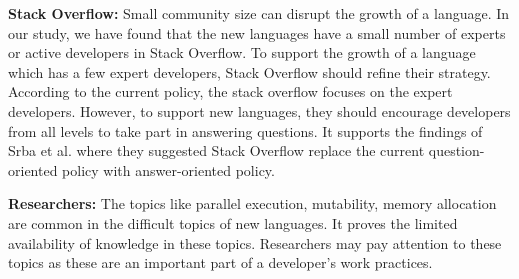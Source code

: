 \indent \textbf{Stack Overflow:} Small community size can disrupt the growth of a language. In our study, we have found that the new languages have a small number of experts or active developers in Stack Overflow. To support the growth of a language which has a few expert developers,  Stack Overflow should refine their strategy. According to the current policy, the stack overflow focuses on the expert developers. However, to support new languages, they should encourage developers from all levels to take part in answering questions. It supports the findings of Srba et al.\citep{Srba2016} where they suggested Stack Overflow replace the current question-oriented policy with answer-oriented policy.

\indent \textbf{Researchers:} The topics like parallel execution, mutability, memory allocation are common in the difficult topics of new languages. It proves the limited availability of knowledge in these topics. Researchers may pay attention to these topics as these are an important part of a developer's work practices.
